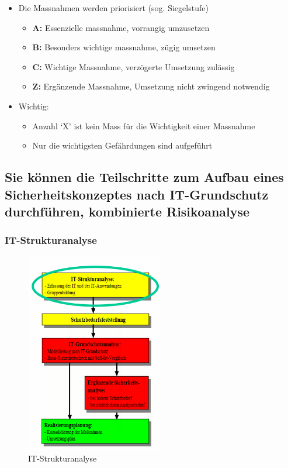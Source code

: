 \documentclass[10pt,a4paper]{article}
\begin{document}
\begin{itemize}[noitemsep,topsep=0pt,leftmargin=*]
    \item Die Massnahmen werden priorisiert (sog. Siegelstufe)
    \begin{itemize}[noitemsep,topsep=0pt,leftmargin=*]
        \item \textbf{A:} Essenzielle massnahme, vorrangig umzusetzen
        \item \textbf{B:} Besonders wichtige massnahme, zügig umsetzen
        \item \textbf{C:} Wichtige Massnahme, verzögerte Umsetzung zulässig
        \item \textbf{Z:} Ergänzende Massnahme, Umsetzung nicht zwingend notwendig
    \end{itemize}
    \item Wichtig:
    \begin{itemize}[noitemsep,topsep=0pt,leftmargin=*]
        \item Anzahl `X' ist kein Mass für die Wichtigkeit einer Massnahme
        \item Nur die wichtigsten Gefährdungen sind aufgeführt
    \end{itemize}
\end{itemize}


\pagebreak %
\subsection*{Sie können die Teilschritte zum Aufbau eines Sicherheitskonzeptes nach IT-Grundschutz durchführen, kombinierte Risikoanalyse}
\subsubsection*{IT-Strukturanalyse}
\begin{figure}[H]
    \begin{center}
    \includegraphics[width=6cm]{images/Strukturanalyse.png}
    \caption{IT-Strukturanalyse}
    \label{IT-Strukturanalyse}
    \end{center}
\end{figure}
\end{document}
